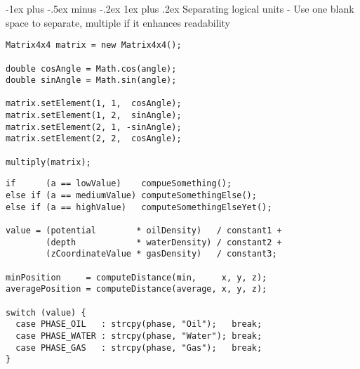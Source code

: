\documentclass[10pt,landscape]{article}
\makeatletter
\renewcommand{\subsubsection}{\@startsection{subsubsection}{3}{0mm}%
                                {-1ex plus -.5ex minus -.2ex}%
                                {1ex plus .2ex}%
                                {\normalfont\small\bfseries}}
\makeatother
\begin{document}
\begin{multicols}{3}
\begin{tabular}{@{}ll@{}}
\end{tabular}

\subsubsection{Separating logical units}
- Use one blank space to separate, multiple if it enhances readability
\begin{verbatim}
Matrix4x4 matrix = new Matrix4x4();

double cosAngle = Math.cos(angle);
double sinAngle = Math.sin(angle);

matrix.setElement(1, 1,  cosAngle);
matrix.setElement(1, 2,  sinAngle);
matrix.setElement(2, 1, -sinAngle);
matrix.setElement(2, 2,  cosAngle);

multiply(matrix);

\end{verbatim}

\begin{verbatim}
if      (a == lowValue)    compueSomething();
else if (a == mediumValue) computeSomethingElse();
else if (a == highValue)   computeSomethingElseYet();

value = (potential        * oilDensity)   / constant1 +
        (depth            * waterDensity) / constant2 +
        (zCoordinateValue * gasDensity)   / constant3;

minPosition     = computeDistance(min,     x, y, z);
averagePosition = computeDistance(average, x, y, z);

switch (value) {
  case PHASE_OIL   : strcpy(phase, "Oil");   break;
  case PHASE_WATER : strcpy(phase, "Water"); break;
  case PHASE_GAS   : strcpy(phase, "Gas");   break;
}
\end{verbatim}


\end{multicols}
\end{document}
